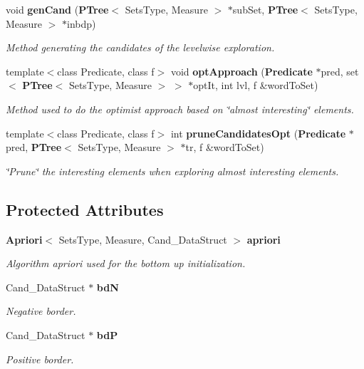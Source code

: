 \begin{CompactItemize}
void {\bf gen\-Cand} ({\bf PTree}$<$ Sets\-Type, Measure $>$ $\ast$sub\-Set, {\bf PTree}$<$ Sets\-Type, Measure $>$ $\ast$inbdp)
\begin{CompactList}\small\item\em Method generating the candidates of the levelwise exploration. \item\end{CompactList}\item 
template$<$class Predicate, class f$>$ void {\bf opt\-Approach} ({\bf Predicate} $\ast$pred, set$<$ {\bf PTree}$<$ Sets\-Type, Measure $>$ $>$ $\ast$opt\-It, int lvl, f \&word\-To\-Set)
\begin{CompactList}\small\item\em Method used to do the optimist approach based on \char`\"{}almost interesting\char`\"{} elements. \item\end{CompactList}\item 
template$<$class Predicate, class f$>$ int {\bf prune\-Candidates\-Opt} ({\bf Predicate} $\ast$pred, {\bf PTree}$<$ Sets\-Type, Measure $>$ $\ast$tr, f \&word\-To\-Set)
\begin{CompactList}\small\item\em \char`\"{}Prune\char`\"{} the interesting elements when exploring almost interesting elements. \item\end{CompactList}\end{CompactItemize}
\subsection*{Protected Attributes}
\begin{CompactItemize}
\item 
{\bf Apriori}$<$ Sets\-Type, Measure, Cand\_\-Data\-Struct $>$ {\bf apriori}\label{class_abs_e5143798f9be145d0712d57d553915c2}

\begin{CompactList}\small\item\em Algorithm apriori used for the bottom up initialization. \item\end{CompactList}\item 
Cand\_\-Data\-Struct $\ast$ {\bf bd\-N}\label{class_abs_84861429e931d82ff76926e5709ecd3f}

\begin{CompactList}\small\item\em Negative border. \item\end{CompactList}\item 
Cand\_\-Data\-Struct $\ast$ {\bf bd\-P}\label{class_abs_891257e049d0299337be5a48983a5297}

\begin{CompactList}\small\item\em Positive border. \item\end{CompactList}\end{CompactItemize}


